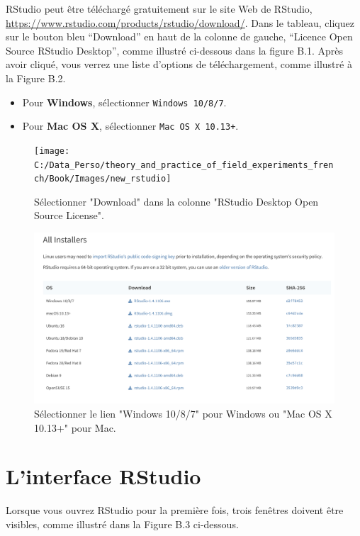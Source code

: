 \documentclass[
  12pt,
]{book}
\providecommand{\tightlist}{%
  \setlength{\itemsep}{0pt}\setlength{\parskip}{0pt}}
\begin{document}
RStudio peut être téléchargé gratuitement sur le site Web de RStudio, \url{https://www.rstudio.com/products/rstudio/download/}. Dans le tableau, cliquez sur le bouton bleu ``Download'' en haut de la colonne de gauche, ``Licence Open Source RStudio Desktop'', comme illustré ci-dessous dans la figure B.1. Après avoir cliqué, vous verrez une liste d'options de téléchargement, comme illustré à la Figure B.2.

\begin{itemize}
\tightlist
\item
  Pour \textbf{Windows}, sélectionner \texttt{Windows\ 10/8/7}.
\item
  Pour \textbf{Mac OS X}, sélectionner \texttt{Mac\ OS\ X\ 10.13+}.
\end{itemize}

\begin{figure}
\texttt{[image: C:/Data\_Perso/theory\_and\_practice\_of\_field\_experiments\_french/Book/Images/new\_rstudio]} \caption{Sélectionner "Download" dans la colonne "RStudio Desktop Open Source License".}\label{fig:rstudiopng}
\end{figure}

\begin{figure}
\includegraphics[width=0.8\linewidth]{Images/rstudio_download} \caption{Sélectionner le lien "Windows 10/8/7" pour Windows ou "Mac OS X 10.13+" pour Mac.}\label{fig:rstudiodownload}
\end{figure}

\hypertarget{linterface-rstudio}{%
\section{L'interface RStudio}\label{linterface-rstudio}}

Lorsque vous ouvrez RStudio pour la première fois, trois fenêtres doivent être visibles, comme illustré dans la Figure B.3 ci-dessous.
\end{document}

